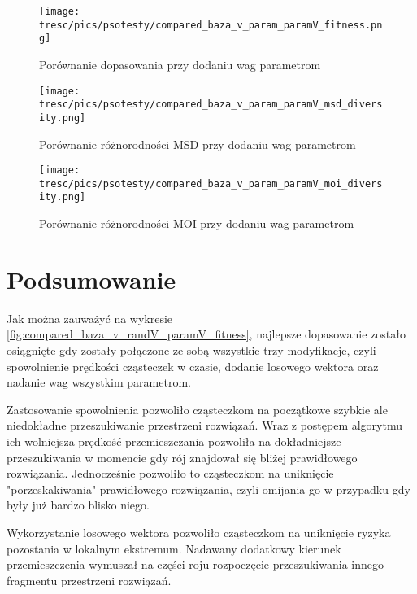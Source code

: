 \clearpage

\begin{figure}[H]
\begin{center} 
\texttt{[image: tresc/pics/psotesty/compared\_baza\_v\_param\_paramV\_fitness.png]}
\caption{Porównanie dopasowania przy dodaniu wag parametrom}
\label{fig:compared_baza_v_param_paramV_fitness}
\end{center}
\end{figure}

\begin{figure}[H]
\begin{center} 
\texttt{[image: tresc/pics/psotesty/compared\_baza\_v\_param\_paramV\_msd\_diversity.png]}
\caption{Porównanie różnorodności MSD przy dodaniu wag parametrom}
\label{fig:compared_baza_v_param_paramV_msd_diversity}
\end{center}
\end{figure}

\begin{figure}[H]
\begin{center} 
\texttt{[image: tresc/pics/psotesty/compared\_baza\_v\_param\_paramV\_moi\_diversity.png]}
\caption{Porównanie różnorodności MOI przy dodaniu wag parametrom}
\label{fig:compared_baza_v_param_paramV_moi_diversity}
\end{center}
\end{figure}


\section{Podsumowanie}
Jak można zauważyć na wykresie \ref{fig:compared_baza_v_randV_paramV_fitness}, najlepsze dopasowanie zostało osiągnięte gdy zostały połączone ze sobą wszystkie trzy modyfikacje, czyli spowolnienie prędkości cząsteczek w czasie, dodanie losowego wektora oraz nadanie wag wszystkim parametrom. 

Zastosowanie spowolnienia pozwoliło cząsteczkom na początkowe szybkie ale niedokładne przeszukiwanie przestrzeni rozwiązań. Wraz z postępem algorytmu ich wolniejsza prędkość przemieszczania pozwoliła na dokładniejsze przeszukiwania w momencie gdy rój znajdował się bliżej prawidłowego rozwiązania. Jednocześnie pozwoliło to cząsteczkom na uniknięcie "porzeskakiwania" prawidłowego rozwiązania, czyli omijania go w przypadku gdy były już bardzo blisko niego.

Wykorzystanie losowego wektora pozwoliło cząsteczkom na uniknięcie ryzyka pozostania w lokalnym ekstremum. Nadawany dodatkowy kierunek przemieszczenia wymuszał na części roju rozpoczęcie przeszukiwania innego fragmentu przestrzeni rozwiązań.

